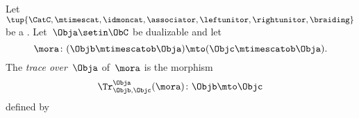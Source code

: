 \begin{widepar}
    \begin{ctdefinition}
        \label{def:trace_gen_endo}
        Let~$\tup{\CatC, \mtimescat, \idmoncat, \associator, \leftunitor, \rightunitor, \braiding}$ be a .
        Let~$\Obja \setin \ObC$ be dualizable and let
        \begin{equation}
            \mora \colon (\Objb \mtimescatob \Obja) \mto( \Objc \mtimescatob \Obja).
        \end{equation}
        The \emph{trace over}~$\Obja$ of~$\mora$ is the morphism
        \begin{equation}
            \Tr_{\Objb, \Objc}^\Obja (\mora) \colon \Objb \mto \Objc
        \end{equation}
        defined by
    \end{ctdefinition}
\end{widepar}


%
%
%
%
%
%

